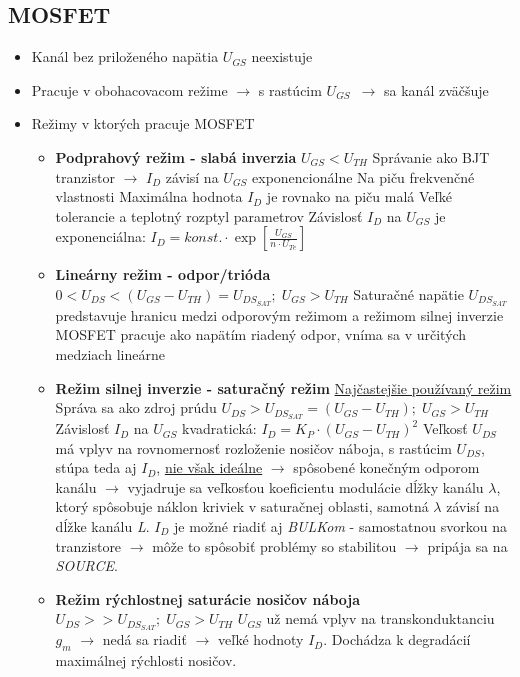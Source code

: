 \subsection{MOSFET}
\begin{itemize}
\item Kanál bez priloženého napätia $U_{GS}$ neexistuje
\item Pracuje v obohacovacom režime $\rightarrow$ s rastúcim $U_{GS}$ $\rightarrow$ sa kanál zväčšuje
\item Režimy v ktorých pracuje MOSFET
\begin{itemize}
	\item \textbf{Podprahový režim - slabá inverzia}
		\subitem $U_{GS} < U_{TH}$
		\subitem Správanie ako BJT tranzistor $\rightarrow$ $I_D$ závisí na $U_{GS}$ exponencionálne
		\subitem Na piču frekvenčné vlastnosti
		\subitem Maximálna hodnota $I_D$ je rovnako na piču malá
		\subitem Veľké tolerancie a teplotný rozptyl parametrov
		\subitem Závislosť $I_D$ na $U_{GS}$ je exponenciálna: \underline{\(I_D = konst. \cdot \exp\left[\frac{U_{GS}}{n \cdot U_{Te}}\right]\)}
	\item  \textbf{Lineárny režim - odpor/trióda}
		\subitem $0 < U_{DS} < (U_{GS} - U_{TH}) = U_{DS_{SAT}}; \; U_{GS} > U_{TH}$
		\subitem Saturačné napätie $U_{DS_{SAT}}$ predstavuje hranicu medzi odporovým režimom a režimom silnej inverzie
		\subitem MOSFET pracuje ako napätím riadený odpor, vníma sa v určitých medziach lineárne
	\item \textbf{Režim silnej inverzie - saturačný režim}
		\subitem \underline{Najčastejšie používaný režim}
		\subitem Správa sa ako zdroj prúdu
		\subitem $U_{DS} > U_{DS_{SAT}} = (U_{GS} - U_{TH}) ; \; U_{GS} > U_{TH}$
		\subitem Závislosť $I_D$ na $U_{GS}$ kvadratická: \underline{\(I_D = K_P \cdot\left(U_{GS} - U_{TH}\right)^2\)}
		\subitem Veľkosť $U_{DS}$ má vplyv na rovnomernosť rozloženie nosičov náboja, s rastúcim $U_{DS}$, stúpa teda aj $I_D$, \underline{nie však ideálne} $\rightarrow$ spôsobené konečným odporom kanálu $\rightarrow$ vyjadruje sa veľkosťou koeficientu modulácie dĺžky kanálu $\lambda$, ktorý spôsobuje náklon kriviek v saturačnej oblasti, samotná $\lambda$ závisí na dĺžke kanálu \emph{L}.
		\subitem $I_D$ je možné riadiť aj \emph{BULKom} - samostatnou svorkou na tranzistore $\rightarrow$ môže to spôsobiť problémy so stabilitou $\rightarrow$ pripája sa na \emph{SOURCE}.
	\item  \textbf{Režim rýchlostnej saturácie nosičov náboja}
		\subitem \(U_{DS} >> U_{DS_{SAT}}; \; U_{GS} > U_{TH}\)
		\subitem $U_{GS}$ už nemá vplyv na transkonduktanciu $g_m$ $\rightarrow$ nedá sa riadiť $\rightarrow$ veľké hodnoty $I_D$.
		\subitem Dochádza k degradácií maximálnej rýchlosti nosičov.
\end{itemize}
\end{itemize}

